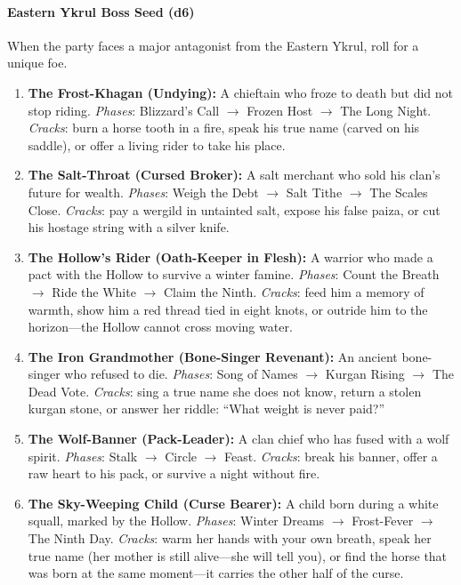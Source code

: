 \paragraph{Eastern Ykrul Boss Seed (d6)}
When the party faces a major antagonist from the Eastern Ykrul, roll for a unique foe.
\begin{enumerate}
  \item \textbf{The Frost-Khagan (Undying):} A chieftain who froze to death but did not stop riding. \emph{Phases}: Blizzard's Call $\rightarrow$ Frozen Host $\rightarrow$ The Long Night. \emph{Cracks}: burn a horse tooth in a fire, speak his true name (carved on his saddle), or offer a living rider to take his place.
  \item \textbf{The Salt-Throat (Cursed Broker):} A salt merchant who sold his clan's future for wealth. \emph{Phases}: Weigh the Debt $\rightarrow$ Salt Tithe $\rightarrow$ The Scales Close. \emph{Cracks}: pay a wergild in untainted salt, expose his false paiza, or cut his hostage string with a silver knife.
  \item \textbf{The Hollow's Rider (Oath-Keeper in Flesh):} A warrior who made a pact with the Hollow to survive a winter famine. \emph{Phases}: Count the Breath $\rightarrow$ Ride the White $\rightarrow$ Claim the Ninth. \emph{Cracks}: feed him a memory of warmth, show him a red thread tied in eight knots, or outride him to the horizon---the Hollow cannot cross moving water.
  \item \textbf{The Iron Grandmother (Bone-Singer Revenant):} An ancient bone-singer who refused to die. \emph{Phases}: Song of Names $\rightarrow$ Kurgan Rising $\rightarrow$ The Dead Vote. \emph{Cracks}: sing a true name she does not know, return a stolen kurgan stone, or answer her riddle: ``What weight is never paid?''
  \item \textbf{The Wolf-Banner (Pack-Leader):} A clan chief who has fused with a wolf spirit. \emph{Phases}: Stalk $\rightarrow$ Circle $\rightarrow$ Feast. \emph{Cracks}: break his banner, offer a raw heart to his pack, or survive a night without fire.
  \item \textbf{The Sky-Weeping Child (Curse Bearer):} A child born during a white squall, marked by the Hollow. \emph{Phases}: Winter Dreams $\rightarrow$ Frost-Fever $\rightarrow$ The Ninth Day. \emph{Cracks}: warm her hands with your own breath, speak her true name (her mother is still alive---she will tell you), or find the horse that was born at the same moment---it carries the other half of the curse.
\end{enumerate}

